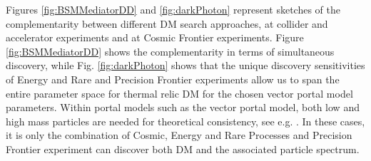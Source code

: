 \documentclass[nofootinbib]{article}
\begin{document}
Figures \ref{fig:BSMMediatorDD} and \ref{fig:darkPhoton} represent sketches of the complementarity between different DM search approaches, at collider and accelerator experiments and at Cosmic Frontier experiments. Figure \ref{fig:BSMMediatorDD} shows the complementarity in terms of simultaneous discovery, while Fig. \ref{fig:darkPhoton} shows that the unique discovery sensitivities of Energy and Rare and Precision Frontier experiments allow us to span the entire parameter space for thermal relic DM for the chosen vector portal model parameters. 
Within portal models such as the vector portal model, both low and high mass particles are needed for theoretical consistency, see e.g. \cite{Batell:2018fqo, Batell:2021xsi, Rizzo:2022qan}. 
In these cases, it is only the combination of Cosmic, Energy and Rare Processes and Precision Frontier experiment can discover both DM and the associated particle spectrum. 
\end{document}
